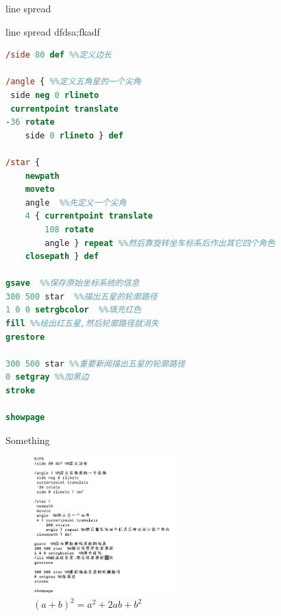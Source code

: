 \documentclass[main.tex]{subfiles}
\begin{document}

line spread

line spread
dfdsa;fkadf

\begin{lstlisting}[language=PostScript]
%!PS
/side 80 def %%定义边长 

/angle { %%定义五角星的一个尖角   
 side neg 0 rlineto
 currentpoint translate
-36 rotate
	side 0 rlineto } def

/star {
	newpath
	moveto
	angle  %%先定义一个尖角
	4 { currentpoint translate
		108 rotate
		angle } repeat %%然后靠旋转坐车标系后作出其它四个角色
	closepath } def

gsave  %%保存原始坐标系统的信息
300 500 star  %%描出五星的轮廓路径
1 0 0 setrgbcolor  %%填充红色
fill %%绘出红五星,然后轮廓路径就消失
grestore

300 500 star %%重要新闻描出五星的轮廓路径
0 setgray %%加黑边
stroke

showpage
\end{lstlisting}




Something
\begin{figure}[h]
	\centering
	\includegraphics[width=0.5\textwidth]{images/star_code.png}
	\caption{$(a+b)^2 = a^2 + 2ab + b^2$}
	\label{fig:III.1.3}
\end{figure}
\end{document}
